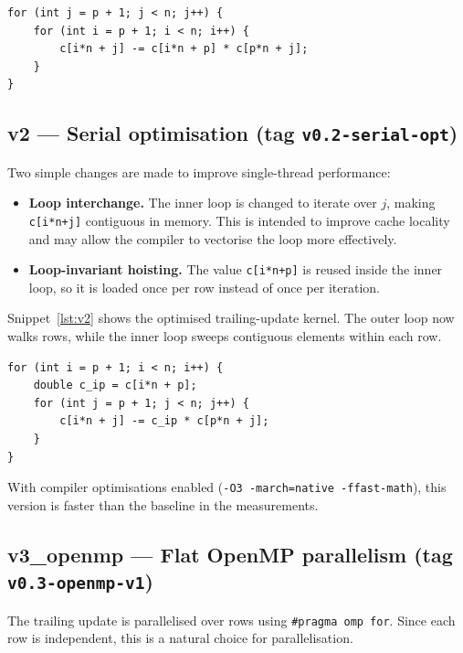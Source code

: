 \documentclass{article}
\newcommand{\snippetspace}{\Needspace{16\baselineskip}}
\begin{document}
\begin{lstlisting}[style=code,caption={Baseline trailing-update kernel in v1.},label={lst:v1}]
for (int j = p + 1; j < n; j++) {
    for (int i = p + 1; i < n; i++) {
        c[i*n + j] -= c[i*n + p] * c[p*n + j];
    }
}
\end{lstlisting}

\subsection{v2 --- Serial optimisation (tag \texttt{v0.2-serial-opt})}

Two simple changes are made to improve single-thread performance:

\begin{itemize}
  \item \textbf{Loop interchange.}
  The inner loop is changed to iterate over $j$, making
  \texttt{c[i*n+j]} contiguous in memory. This is intended to improve
  cache locality and may allow the compiler to vectorise the loop more
  effectively.

  \item \textbf{Loop-invariant hoisting.}
  The value \texttt{c[i*n+p]} is reused inside the inner loop, so it is
  loaded once per row instead of once per iteration.
\end{itemize}

\snippetspace
Snippet~\ref{lst:v2} shows the optimised trailing-update kernel. The outer loop
now walks rows, while the inner loop sweeps contiguous elements within each row.

\begin{lstlisting}[style=code,caption={Optimised trailing-update kernel in v2.},label={lst:v2}]
for (int i = p + 1; i < n; i++) {
    double c_ip = c[i*n + p];
    for (int j = p + 1; j < n; j++) {
        c[i*n + j] -= c_ip * c[p*n + j];
    }
}
\end{lstlisting}

With compiler optimisations enabled (\texttt{-O3 -march=native -ffast-math}),
this version is faster than the baseline in the measurements.

\subsection{v3\_openmp --- Flat OpenMP parallelism (tag \texttt{v0.3-openmp-v1})}

The trailing update is parallelised over rows using
\texttt{\#pragma omp for}. Since each row is independent, this is a natural
choice for parallelisation.
\end{document}
